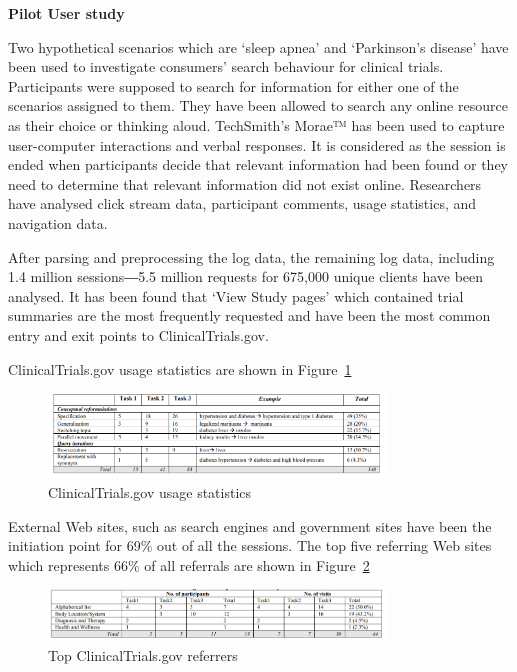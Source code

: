 \documentclass[]{article}
\begin{document}
\textbf{Pilot User study}

Two hypothetical scenarios which are ‘sleep apnea’ and ‘Parkinson’s disease’ have been used to investigate consumers’ search behaviour for clinical trials. Participants were supposed to search for information for either one of the scenarios assigned to them. They have been allowed to search any online resource as their choice or thinking aloud. TechSmith’s Morae™ has been used to capture user-computer interactions and verbal responses. It is considered as the session is ended when participants decide that relevant information had been found or they need to determine that relevant information did not exist online. Researchers have analysed click stream data, participant comments, usage statistics, and navigation data.

After parsing and preprocessing the log data, the remaining log data, including 1.4 million sessions―5.5 million requests for 675,000 unique clients have been analysed. It has been found that ‘View Study pages’ which contained trial summaries are the most frequently requested and have been the most common entry and exit points to ClinicalTrials.gov. 

ClinicalTrials.gov usage statistics are shown in Figure~\ref{fig19}

\begin{figure}[t!]
	\includegraphics[width=0.8\textwidth]{Capture19.png}
	\caption{ClinicalTrials.gov usage statistics \label{fig19}}
\end{figure}

External Web sites, such as search engines and government sites have been the initiation point for 69\% out of all the sessions. The top five referring Web sites which represents 66\% of all referrals are shown in Figure~\ref{fig20}

\begin{figure}[t!]
	\includegraphics[width=0.8\textwidth]{Capture20.png}
	\caption{Top ClinicalTrials.gov referrers \label{fig20}}
\end{figure}
\end{document}
